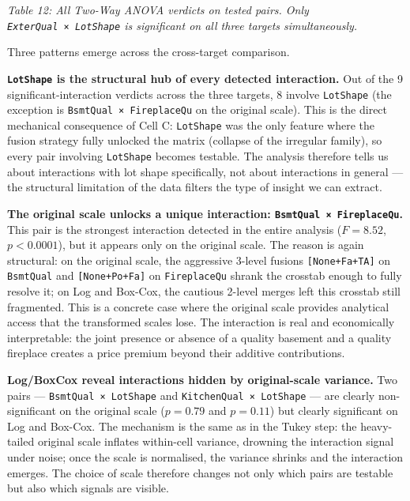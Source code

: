 \emph{Table 12: All Two-Way ANOVA verdicts on tested pairs. Only
\texttt{ExterQual\ ×\ LotShape} is significant on all three targets
simultaneously.}

Three patterns emerge across the cross-target comparison.

\textbf{\texttt{LotShape} is the structural hub of every detected
interaction.} Out of the 9 significant-interaction verdicts across the
three targets, 8 involve \texttt{LotShape} (the exception is
\texttt{BsmtQual\ ×\ FireplaceQu} on the original scale). This is the
direct mechanical consequence of Cell C: \texttt{LotShape} was the only
feature where the fusion strategy fully unlocked the matrix (collapse of
the irregular family), so every pair involving \texttt{LotShape} becomes
testable. The analysis therefore tells us about interactions with lot
shape specifically, not about interactions in general --- the structural
limitation of the data filters the type of insight we can extract.

\textbf{The original scale unlocks a unique interaction:
\texttt{BsmtQual\ ×\ FireplaceQu}.} This pair is the strongest
interaction detected in the entire analysis (\(F = 8.52\),
\(p < 0.0001\)), but it appears only on the original scale. The reason
is again structural: on the original scale, the aggressive 3-level
fusions \texttt{{[}None+Fa+TA{]}} on \texttt{BsmtQual} and
\texttt{{[}None+Po+Fa{]}} on \texttt{FireplaceQu} shrank the crosstab
enough to fully resolve it; on Log and Box-Cox, the cautious 2-level
merges left this crosstab still fragmented. This is a concrete case
where the original scale provides analytical access that the transformed
scales lose. The interaction is real and economically interpretable: the
joint presence or absence of a quality basement and a quality fireplace
creates a price premium beyond their additive contributions.

\textbf{Log/BoxCox reveal interactions hidden by original-scale
variance.} Two pairs --- \texttt{BsmtQual\ ×\ LotShape} and
\texttt{KitchenQual\ ×\ LotShape} --- are clearly non-significant on the
original scale (\(p = 0.79\) and \(p = 0.11\)) but clearly significant
on Log and Box-Cox. The mechanism is the same as in the Tukey step: the
heavy-tailed original scale inflates within-cell variance, drowning the
interaction signal under noise; once the scale is normalised, the
variance shrinks and the interaction emerges. The choice of scale
therefore changes not only which pairs are testable but also which
signals are visible.

